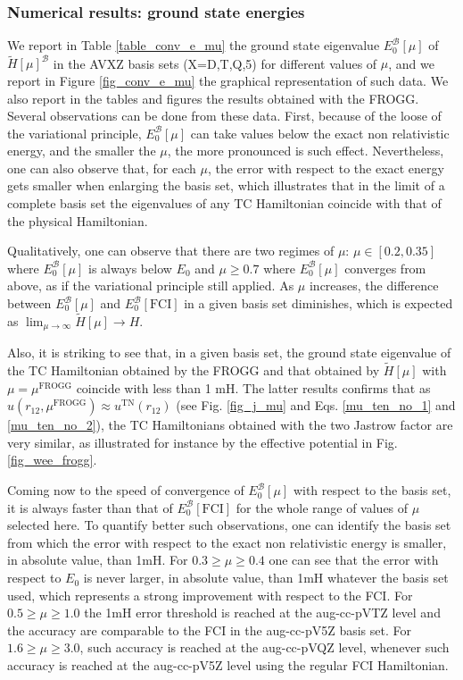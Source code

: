 \documentclass[aip,jcp,reprint,noshowkeys,superscriptaddress,twocolumn]{revtex4-1}
\newcommand{\mfrogg}[0]{\mu^\text{FROGG}}
\newcommand{\basis}[0]{\mathcal{B}}
\begin{document}
\subsubsection{Numerical results: ground state energies}
\label{sec:total_e}
We report in Table \ref{table_conv_e_mu} the ground state eigenvalue $E_0^{\basis}[\mu]$ of $\tilde{H}[\mu]^{\basis}$ in the AVXZ basis sets (X=D,T,Q,5) for different values of $\mu$, and we report in Figure \ref{fig_conv_e_mu} the graphical representation of such data. We also report in the tables and figures the results obtained with the FROGG. 
Several observations can be done from these data. First, because of the loose of the variational principle, $E_0^{\basis}[\mu]$ can take values below the exact non relativistic energy, and the smaller the $\mu$, the more pronounced is such effect. 
Nevertheless, one can also observe that, for each $\mu$, the error with respect to the exact energy gets smaller  
when enlarging the basis set, which illustrates that in the limit of a complete basis set the eigenvalues of any TC Hamiltonian coincide with that of the physical Hamiltonian. 

Qualitatively, one can observe that there are two regimes of $\mu$: $\mu \in[0.2,0.35]$ where $E_0^{\basis}[\mu]$ is always below $E_0$ and $\mu\ge 0.7$ where $E_0^{\basis}[\mu]$ converges from above, as if the variational principle still applied. 
As $\mu$ increases, the difference between $E_0^{\basis}[\mu]$ and $E_0^{\basis}[\text{FCI}]$ in a given basis set diminishes, 
which is expected as $\lim_{\mu \rightarrow \infty} \tilde{H}[\mu] \rightarrow H$. 

Also, it is striking to see that, in a given basis set, the ground state eigenvalue of the TC Hamiltonian obtained by the FROGG and that obtained by $\tilde{H}[\mu]$ with $\mu=\mfrogg$ coincide with less than 1 mH. 
The latter results confirms that as $u(r_{12},\mfrogg) \approx u^{\text{TN}}(r_{12})$ (see Fig. \ref{fig_j_mu} and Eqs. \eqref{mu_ten_no_1} and \eqref{mu_ten_no_2}), the TC Hamiltonians obtained with the two Jastrow factor are very similar, as illustrated for instance by the effective potential in Fig. \ref{fig_wee_frogg}. 

Coming now to the speed of convergence of $E_0^{\basis}[\mu]$ with respect to the basis set, it is always faster than that of $E_0^{\basis}[\text{FCI}]$ for the whole range of values of $\mu$ selected here. 
To quantify better such observations, one can identify the basis set from which the error with respect to the exact non relativistic energy is smaller, in absolute value, than 1mH. 
For $0.3\ge\mu\ge0.4$ one can see that the error with respect to $E_0$ is never larger, in absolute value, than 1mH whatever the basis set used, which represents a strong improvement with respect to the FCI. For $0.5\ge \mu \ge 1.0$ the 1mH error threshold is reached at the aug-cc-pVTZ level and the accuracy are comparable to the FCI in the aug-cc-pV5Z basis set. For $1.6\ge \mu \ge 3.0$, such accuracy is reached at the aug-cc-pVQZ level, whenever such accuracy is reached at the aug-cc-pV5Z level using the regular FCI Hamiltonian. 
\end{document}
